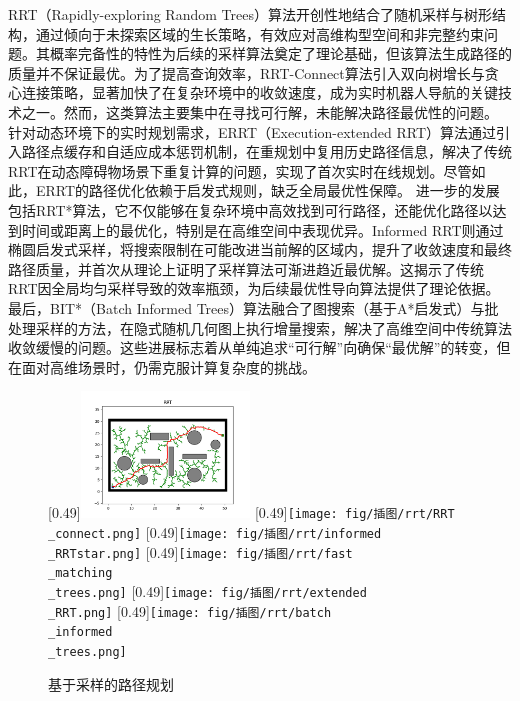 \documentclass[master,academic]{ysuthesis} %
\begin{document}
		RRT（Rapidly-exploring Random Trees）算法开创性地结合了随机采样与树形结构，通过倾向于未探索区域的生长策略，有效应对高维构型空间和非完整约束问题。其概率完备性的特性为后续的采样算法奠定了理论基础，但该算法生成路径的质量并不保证最优。为了提高查询效率，RRT-Connect算法引入双向树增长与贪心连接策略，显著加快了在复杂环境中的收敛速度，成为实时机器人导航的关键技术之一。然而，这类算法主要集中在寻找可行解，未能解决路径最优性的问题。
		针对动态环境下的实时规划需求，ERRT（Execution-extended RRT）算法通过引入路径点缓存和自适应成本惩罚机制，在重规划中复用历史路径信息，解决了传统RRT在动态障碍物场景下重复计算的问题，实现了首次实时在线规划。尽管如此，ERRT的路径优化依赖于启发式规则，缺乏全局最优性保障。
		进一步的发展包括RRT*算法，它不仅能够在复杂环境中高效找到可行路径，还能优化路径以达到时间或距离上的最优化，特别是在高维空间中表现优异。Informed RRT则通过椭圆启发式采样，将搜索限制在可能改进当前解的区域内，提升了收敛速度和最终路径质量，并首次从理论上证明了采样算法可渐进趋近最优解。这揭示了传统RRT因全局均匀采样导致的效率瓶颈，为后续最优性导向算法提供了理论依据。
		最后，BIT*（Batch Informed Trees）算法融合了图搜索（基于A*启发式）与批处理采样的方法，在隐式随机几何图上执行增量搜索，解决了高维空间中传统算法收敛缓慢的问题。这些进展标志着从单纯追求“可行解”向确保“最优解”的转变，但在面对高维场景时，仍需克服计算复杂度的挑战。
		\begin{figure}[!ht]
			\centering
			[0.49\textwidth]{\includegraphics[width=0.4\textwidth]{fig/插图/rrt/RRT.png}}
			[0.49\textwidth]{\texttt{[image: fig/插图/rrt/RRT\\\_connect.png]}}
			[0.49\textwidth]{\texttt{[image: fig/插图/rrt/informed\\\_RRTstar.png]}}
			[0.49\textwidth]{\texttt{[image: fig/插图/rrt/fast\\\_matching\\\_trees.png]}}
			[0.49\textwidth]{\texttt{[image: fig/插图/rrt/extended\\\_RRT.png]}}
			[0.49\textwidth]{\texttt{[image: fig/插图/rrt/batch\\\_informed\\\_trees.png]}}
			\caption{基于采样的路径规划}
			\label{fig:基于采样的路径规划}
		\end{figure}
\end{document}
